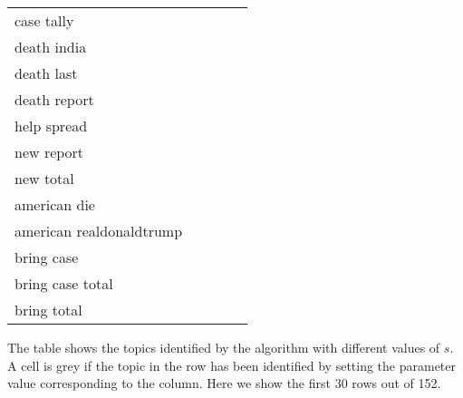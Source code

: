 \begin{table}
\begin{tabular}{>{\raggedright}p{}>{\raggedright}p{}p{}p{}p{}}
                case tally &        {} &        {} & \checkC{} & \checkC{} \\
                death india &        {} &        {} & \checkC{} & \checkC{} \\
                death last &        {} &        {} & \checkC{} & \checkC{} \\
                death report &        {} &        {} & \checkC{} & \checkC{} \\
                help spread &        {} &        {} & \checkC{} & \checkC{} \\
                new report &        {} &        {} & \checkC{} & \checkC{} \\
                new total &        {} &        {} & \checkC{} & \checkC{} \\
                american die &        {} &        {} &        {} & \checkC{} \\
                american realdonaldtrump &        {} &        {} &        {} & \checkC{} \\
                bring case &        {} &        {} &        {} & \checkC{} \\
                bring case total &        {} &        {} &        {} & \checkC{} \\
                bring total &        {} &        {} &        {} & \checkC{} \\
                
    \bottomrule
    \end{tabular}
    
        \begin{flushleft}
        The table shows the topics identified by the algorithm with different values 
        of $s$. A cell is grey if the topic in the row has been identified by setting the parameter
        value corresponding to the column. Here we show the first 30 rows out of 152. 
    \end{flushleft}
        
\end{table}


